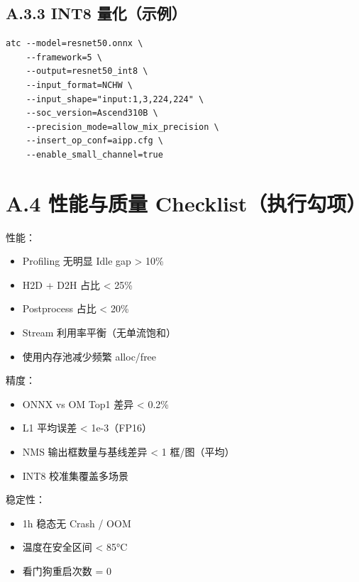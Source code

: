 \subsection{A.3.3 INT8 量化（示例）}\label{src-book-appendix-h6}

\begin{lstlisting}
atc --model=resnet50.onnx \
    --framework=5 \
    --output=resnet50_int8 \
    --input_format=NCHW \
    --input_shape="input:1,3,224,224" \
    --soc_version=Ascend310B \
    --precision_mode=allow_mix_precision \
    --insert_op_conf=aipp.cfg \
    --enable_small_channel=true
\end{lstlisting}

\section{A.4 性能与质量
Checklist（执行勾项）}\label{src-book-appendix-h7}

性能：

\begin{itemize}
\tightlist
\item[$\square$]
  Profiling 无明显 Idle gap \textgreater{} 10\%
\item[$\square$]
  H2D + D2H 占比 \textless{} 25\%
\item[$\square$]
  Postprocess 占比 \textless{} 20\%
\item[$\square$]
  Stream 利用率平衡（无单流饱和）
\item[$\square$]
  使用内存池减少频繁 alloc/free
\end{itemize}

精度：

\begin{itemize}
\tightlist
\item[$\square$]
  ONNX vs OM Top1 差异 \textless{} 0.2\%
\item[$\square$]
  L1 平均误差 \textless{} 1e-3（FP16）
\item[$\square$]
  NMS 输出框数量与基线差异 \textless{} 1 框/图（平均）
\item[$\square$]
  INT8 校准集覆盖多场景
\end{itemize}

稳定性：

\begin{itemize}
\tightlist
\item[$\square$]
  1h 稳态无 Crash / OOM
\item[$\square$]
  温度在安全区间 \textless{} 85°C
\item[$\square$]
  看门狗重启次数 = 0
\end{itemize}

